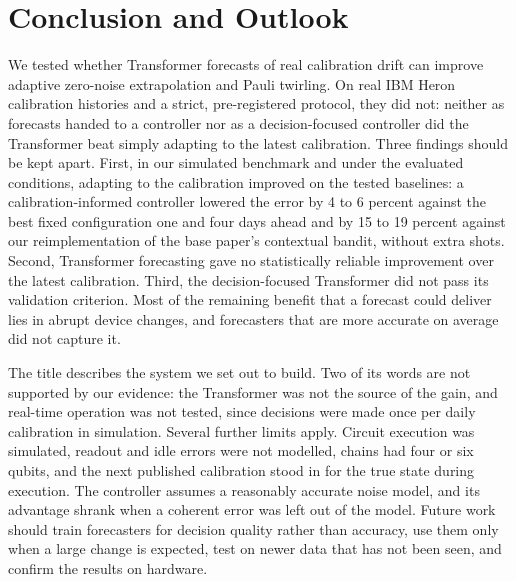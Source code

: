 \documentclass[conference]{IEEEtran}
\begin{document}
\section{Conclusion and Outlook}
We tested whether Transformer forecasts of real calibration drift can improve adaptive zero-noise extrapolation and Pauli twirling. On real IBM Heron calibration histories and a strict, pre-registered protocol, they did not: neither as forecasts handed to a controller nor as a decision-focused controller did the Transformer beat simply adapting to the latest calibration. Three findings should be kept apart. First, in our simulated benchmark and under the evaluated conditions, adapting to the calibration improved on the tested baselines: a calibration-informed controller lowered the error by 4 to 6 percent against the best fixed configuration one and four days ahead and by 15 to 19 percent against our reimplementation of the base paper's contextual bandit, without extra shots. Second, Transformer forecasting gave no statistically reliable improvement over the latest calibration. Third, the decision-focused Transformer did not pass its validation criterion. Most of the remaining benefit that a forecast could deliver lies in abrupt device changes, and forecasters that are more accurate on average did not capture it.

The title describes the system we set out to build. Two of its words are not supported by our evidence: the Transformer was not the source of the gain, and real-time operation was not tested, since decisions were made once per daily calibration in simulation. Several further limits apply. Circuit execution was simulated, readout and idle errors were not modelled, chains had four or six qubits, and the next published calibration stood in for the true state during execution. The controller assumes a reasonably accurate noise model, and its advantage shrank when a coherent error was left out of the model. Future work should train forecasters for decision quality rather than accuracy, use them only when a large change is expected, test on newer data that has not been seen, and confirm the results on hardware.
\end{document}
